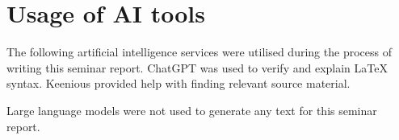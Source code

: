\chapter*{Usage of AI tools}\label{ch:ai}

The following artificial intelligence services were utilised during the process of writing this seminar report. ChatGPT \citep{openai_chatgpt_2024} was used to verify and explain LaTeX syntax. Keenious \citep{keenious_keenious_2024} provided help with finding relevant source material.

Large language models were not used to generate any text for this seminar report.
